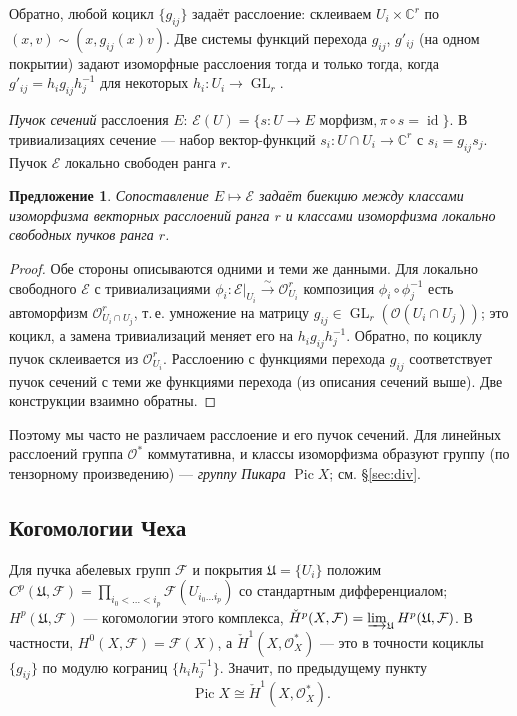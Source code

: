 \documentclass[11pt,a4paper]{article}
\theoremstyle{plain}
\newtheorem{proposition}[theorem]{Предложение}
\theoremstyle{definition}
\theoremstyle{remark}
\renewcommand{\C}{\mathbb{C}}
\newcommand{\cO}{\mathcal{O}}
\newcommand{\cE}{\mathcal{E}}
\newcommand{\cF}{\mathcal{F}}
\DeclareMathOperator{\Pic}{Pic}
\DeclareMathOperator{\GL}{GL}
\DeclareMathOperator{\id}{id}
\begin{document}
Обратно, любой коцикл $\{g_{ij}\}$ задаёт расслоение: склеиваем $U_i\times\C^r$ по
$(x,v)\sim(x,g_{ij}(x)v)$. Две системы функций перехода $g_{ij}$, $g'_{ij}$ (на одном
покрытии) задают изоморфные расслоения тогда и только тогда, когда
$g'_{ij}=h_ig_{ij}h_j^{-1}$ для некоторых $h_i\colon U_i\to \GL_r$.

\emph{Пучок сечений} расслоения $E$: $\cE(U)=\{s\colon U\to E \text{ морфизм}, \pi\circ s=\id\}$.
В тривиализациях сечение --- набор вектор-функций $s_i\colon U\cap U_i\to\C^r$ с
$s_i=g_{ij}s_j$. Пучок $\cE$ локально свободен ранга $r$.

\begin{proposition}\label{prop:bundles-sheaves}
Сопоставление $E\mapsto\cE$ задаёт биекцию между классами изоморфизма векторных расслоений
ранга $r$ и классами изоморфизма локально свободных пучков ранга $r$.
\end{proposition}
\begin{proof}
Обе стороны описываются одними и теми же данными. Для локально свободного $\cE$ с
тривиализациями $\phi_i\colon\cE|_{U_i}\xrightarrow{\sim}\cO_{U_i}^r$ композиция
$\phi_i\circ\phi_j^{-1}$ есть автоморфизм $\cO^r_{U_i\cap U_j}$, т.\,е. умножение на матрицу
$g_{ij}\in \GL_r(\cO(U_i\cap U_j))$; это коцикл, а замена тривиализаций меняет его на
$h_ig_{ij}h_j^{-1}$. Обратно, по коциклу пучок склеивается из $\cO_{U_i}^r$. Расслоению с
функциями перехода $g_{ij}$ соответствует пучок сечений с теми же функциями перехода (из
описания сечений выше). Две конструкции взаимно обратны.
\end{proof}

Поэтому мы часто не различаем расслоение и его пучок сечений. Для линейных расслоений группа
$\cO^*$ коммутативна, и классы изоморфизма образуют группу (по тензорному произведению) ---
\emph{группу Пикара} $\Pic X$; см. \S\ref{sec:div}.

\subsection{Когомологии Чеха}

Для пучка абелевых групп $\cF$ и покрытия $\mathfrak U=\{U_i\}$ положим
$C^p(\mathfrak U,\cF)=\prod_{i_0<\dots<i_p}\cF(U_{i_0\dots i_p})$ со стандартным дифференциалом;
$H^p(\mathfrak U,\cF)$ --- когомологии этого комплекса, $\check H^p(X,\cF)=
\varinjlim_{\mathfrak U}H^p(\mathfrak U,\cF)$. В частности, $H^0(X,\cF)=\cF(X)$, а
$\check H^1(X,\cO_X^*)$ --- это в точности коциклы $\{g_{ij}\}$ по модулю кограниц
$\{h_ih_j^{-1}\}$. Значит, по предыдущему пункту
\[
\Pic X\cong \check H^1(X,\cO_X^*).
\]
\end{document}

